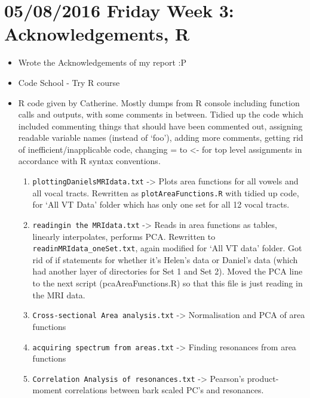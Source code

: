 \documentclass{article}
\begin{document}
\section*{05/08/2016 Friday Week 3: Acknowledgements, R}
\begin{itemize}
    \item Wrote the Acknowledgements of my report :P
    \item Code School - Try R course
    \item R code given by Catherine. Mostly dumps from R console including function calls and outputs, with some comments in between. Tidied up the code which included commenting things that should have been commented out, assigning readable variable names (instead of `foo'), adding more comments, getting rid of inefficient/inapplicable code, changing = to <- for top level assignments in accordance with R syntax conventions.
    \begin{enumerate}
        \item \verb|plottingDanielsMRIdata.txt| -> Plots area functions for all vowels and all vocal tracts. Rewritten as \verb|plotAreaFunctions.R| with tidied up code, for `All VT Data' folder which has only one set for all 12 vocal tracts.
        \item \verb|readingin the MRIdata.txt| -> Reads in area functions as tables, linearly interpolates, performs PCA. Rewritten to \verb|readinMRIdata_oneSet.txt|, again modified for `All VT data' folder. Got rid of if statements for whether it's Helen's data or Daniel's data (which had another layer of directories for Set 1 and Set 2). Moved the PCA line to the next script (pcaAreaFunctions.R) so that this file is just reading in the MRI data.
        \item \verb|Cross-sectional Area analysis.txt| -> Normalisation and PCA of area functions
        \item \verb|acquiring spectrum from areas.txt| -> Finding resonances from area functions
        \item \verb|Correlation Analysis of resonances.txt| -> Pearson's product-moment correlations between bark scaled PC's and resonances.
    \end{enumerate}
\end{itemize}
\end{document}
